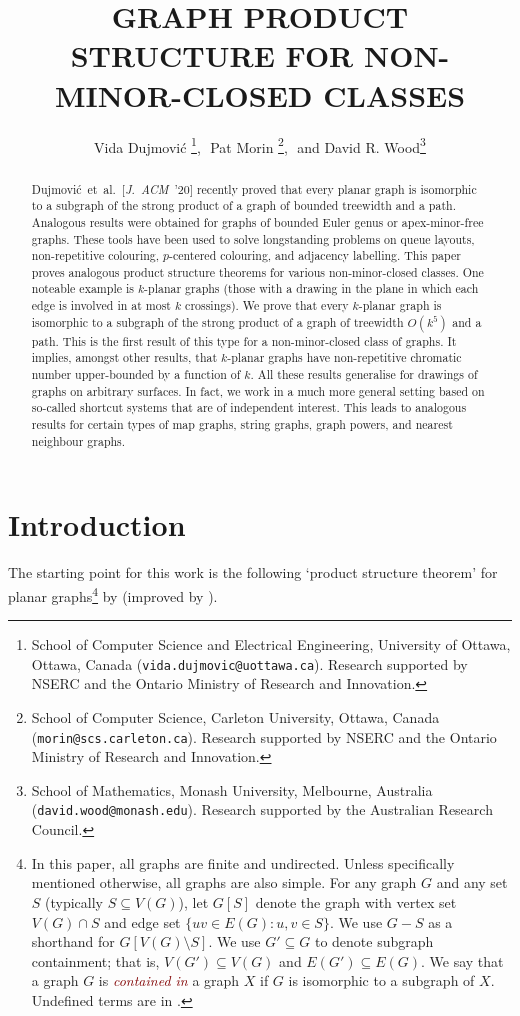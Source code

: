 \documentclass{patmorin}
\title{\MakeUppercase{Graph Product Structure for Non-Minor-Closed Classes}}
\author{Vida Dujmovi\'c%
        \thanks{School of Computer Science and Electrical Engineering,
                University of Ottawa, Ottawa, Canada (\texttt{vida.dujmovic@uottawa.ca}).
                Research supported by NSERC and the Ontario Ministry of Research and Innovation.},\,\,
        Pat Morin%
        \thanks{School of Computer Science, Carleton University, Ottawa, Canada (\texttt{morin@scs.carleton.ca}). Research  supported by NSERC and the Ontario Ministry of Research and Innovation.},\,\, and
        David R. Wood\thanks{School of Mathematics, Monash University, Melbourne, Australia (\texttt{david.wood@monash.edu}). Research supported by the Australian Research Council.}
}
\newcommand{\defin}[1]{\textcolor{Maroon}{\emph{#1}}}
\begin{document}
\begin{titlepage}
\maketitle

\begin{abstract}
Dujmovi\'c~et~al.~[\emph{J.~ACM}~'20] recently proved that every planar graph is isomorphic to a subgraph of the strong product of a graph of bounded treewidth and a path. Analogous results were obtained for graphs of bounded Euler genus or apex-minor-free graphs. These tools have been used to solve longstanding problems on queue layouts, non-repetitive colouring, $p$-centered colouring, and adjacency labelling. This paper proves analogous product structure theorems for various non-minor-closed classes. One noteable example is $k$-planar graphs (those with a drawing in the plane in which each edge is involved in at most $k$ crossings). We prove that every $k$-planar graph is isomorphic to a subgraph of the strong product of a graph of treewidth $O(k^5)$ and a path. This is the first result of this type for a non-minor-closed class of graphs. It implies, amongst other results, that $k$-planar graphs have non-repetitive chromatic number upper-bounded by a function of $k$. All these results generalise for drawings of graphs on arbitrary surfaces. In fact, we work in a much more general setting based on so-called shortcut systems that are of independent interest. This leads to analogous results for certain types of map graphs, string graphs, graph powers, and nearest neighbour graphs.
\end{abstract}
\end{titlepage}
\tableofcontents
\newpage

\section{Introduction}
\label{Introduction}

The starting point for this work is the following `product structure theorem' for planar graphs\footnote{In this paper, all graphs are finite and undirected. Unless specifically mentioned otherwise, all graphs are also simple. For any graph $G$ and any set $S$ (typically $S\subseteq V(G)$), let $G[S]$  denote the graph with vertex set $V(G)\cap S$ and edge set $\{uv\in E(G) : u,v\in S\}$.  We use $G-S$ as a shorthand for $G[V(G)\setminus S]$. We use $G'\subseteq G$ to denote subgraph containment; that is, $V(G')\subseteq V(G)$ and $E(G')\subseteq E(G)$.  We say that a graph $G$ is \defin{contained in} a graph $X$ if $G$ is isomorphic to a subgraph of $X$. Undefined terms are in \citep{Diestel5}.} by \citet{DJMMUW20} (improved by \citet{UWY}).
\end{document}
